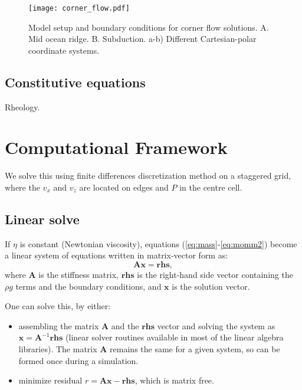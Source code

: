 \documentclass[a4paper,11pt]{article}
\begin{document}
\begin{figure}
\begin{center}
\noindent \texttt{[image: corner\_flow.pdf]} 
\caption{Model setup and boundary conditions for corner flow solutions. A. Mid ocean ridge. B. Subduction. a-b) Different Cartesian-polar coordinate systems.}
\label{fig:corner_flow}
  \end{center}
\end{figure}

\subsection{Constitutive equations}
Rheology. 

\section{Computational Framework}

We solve this using finite differences discretization method on a staggered grid, where the $v_x$ and $v_z$ are located on edges and $P$ in the centre cell.

\subsection{Linear solve}
If $\eta$ is constant (Newtonian viscosity), equations (\ref{eq:mass}-\ref{eq:momm2}) become a linear system of equations written in matrix-vector form as:
\begin{equation}
\textbf{A} \textbf{x} = \textbf{rhs},
\end{equation}
where $\textbf{A}$ is the stiffness matrix, $\textbf{rhs}$ is the right-hand side vector containing the $\rho g$ terms and the boundary conditions, and $\textbf{x} $ is the solution vector. 

One can solve this, by either:
\begin{itemize} 
\item assembling the matrix $\textbf{A}$ and the $\textbf{rhs}$ vector and solving the system as $\textbf{x} = \textbf{A}^{-1}\textbf{rhs}$ (linear solver routines available in most of the linear algebra libraries). The matrix $\textbf{A}$ remains the same for a given system, so can be formed once during a simulation. 
\item minimize residual $r = \textbf{A} \textbf{x} - \textbf{rhs}$, which is matrix free.
\end{itemize}
\end{document}
